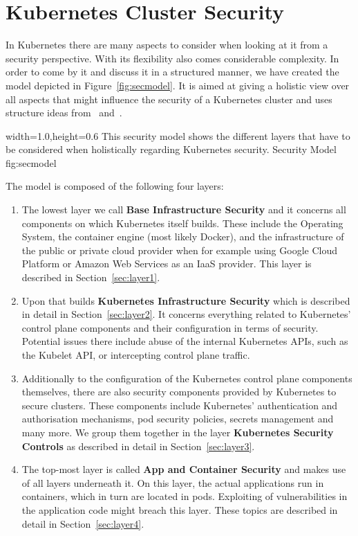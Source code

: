 \chapter{Kubernetes Cluster Security}\label{chap:clusterSecurity}

In Kubernetes there are many aspects to consider when looking at it from a security perspective. With its flexibility also comes considerable complexity. In order to come by it and discuss it in a structured manner, we have created the model depicted in Figure~\ref{fig:secmodel}. It is aimed at giving a holistic view over all aspects that might influence the security of a Kubernetes cluster and uses structure ideas from~\textcite{securingkubernetes} and~\textcite{kubernetessecurity}.

  {width=1.0\textwidth,height=0.6\textheight}%
  {This security model shows the different layers that have to be considered when holistically regarding Kubernetes security.}%
  {Security Model}%
  {fig:secmodel}%

The model is composed of the following four layers:

\begin{enumerate}
    \item The lowest layer we call \textbf{Base Infrastructure Security} and it concerns all components on which Kubernetes itself builds. These include the Operating System, the container engine (most likely Docker), and the infrastructure of the public or private cloud provider when for example using Google Cloud Platform or Amazon Web Services as an \ac{IaaS} provider. This layer is described in Section~\ref{sec:layer1}.
    \item Upon that builds \textbf{Kubernetes Infrastructure Security} which is described in detail in Section~\ref{sec:layer2}. It concerns everything related to Kubernetes' control plane components and their configuration in terms of security. Potential issues there include abuse of the internal Kubernetes APIs, such as the Kubelet API, or intercepting control plane traffic.
    \item Additionally to the configuration of the Kubernetes control plane components themselves, there are also security components provided by Kubernetes to secure clusters. These components include Kubernetes' authentication and authorisation mechanisms, pod security policies, secrets management and many more. We group them together in the layer \textbf{Kubernetes Security Controls} as described in detail in Section~\ref{sec:layer3}.
    \item The top-most layer is called \textbf{App and Container Security} and makes use of all layers underneath it. On this layer, the actual applications run in containers, which in turn are located in pods. Exploiting of vulnerabilities in the application code might breach this layer. These topics are described in detail in Section~\ref{sec:layer4}.
\end{enumerate}

